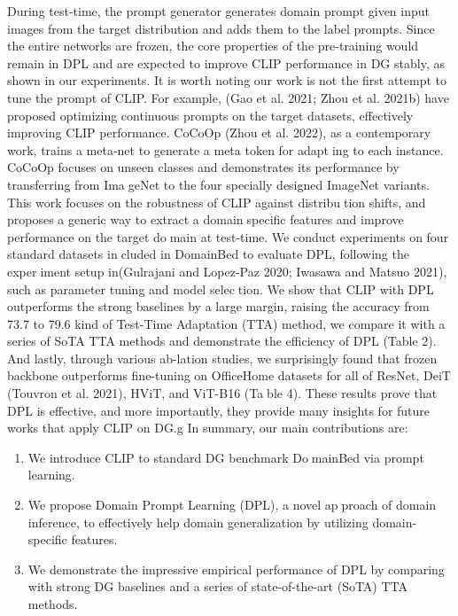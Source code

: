 \documentclass{article}
\begin{document}
\begin{multicols}{2}
During test-time, the prompt generator generates domain
prompt given input images from the target distribution and
adds them to the label prompts. Since the entire networks are
frozen, the core properties of the pre-training would remain
in DPL and are expected to improve CLIP performance in
DG stably, as shown in our experiments.
It is worth noting our work is not the first attempt to
tune the prompt of CLIP. For example, (Gao et al. 2021;
Zhou et al. 2021b) have proposed optimizing continuous
prompts on the target datasets, effectively improving CLIP
performance. CoCoOp (Zhou et al. 2022), as a contemporary
work, trains a meta-net to generate a meta token for adapting to each instance. CoCoOp focuses on unseen classes
and demonstrates its performance by transferring from ImageNet to the four specially designed ImageNet variants. This
work focuses on the robustness of CLIP against distribution shifts, and proposes a generic way to extract a domainspecific features and improve performance on the target domain at test-time.
We conduct experiments on four standard datasets included in DomainBed to evaluate DPL, following the experiment setup in(Gulrajani and Lopez-Paz 2020; Iwasawa and
Matsuo 2021), such as parameter tuning and model selection. We show that CLIP with DPL outperforms the strong
baselines by a large margin, raising the accuracy from 73.7%
to 79.6%
kind of Test-Time Adaptation (TTA) method, we compare
it with a series of SoTA TTA methods and demonstrate the
efficiency of DPL (Table 2). And lastly, through various ab-lation studies, we surprisingly found that frozen backbone
outperforms fine-tuning on OfficeHome datasets for all of
ResNet, DeiT (Touvron et al. 2021), HViT, and ViT-B16 (Table 4). These results prove that DPL is effective, and more
importantly, they provide many insights for future works that
apply CLIP on DG.g
In summary, our main contributions are:
\begin{enumerate}
    \item We introduce CLIP to standard DG benchmark DomainBed via prompt learning.
    \item We propose Domain Prompt Learning (DPL), a novel approach of domain inference, to effectively help domain
generalization by utilizing domain-specific features.
    \item We demonstrate the impressive empirical performance of
DPL by comparing with strong DG baselines and a series
of state-of-the-art (SoTA) TTA methods.


\end{enumerate}
\end{multicols}
\end{document}
